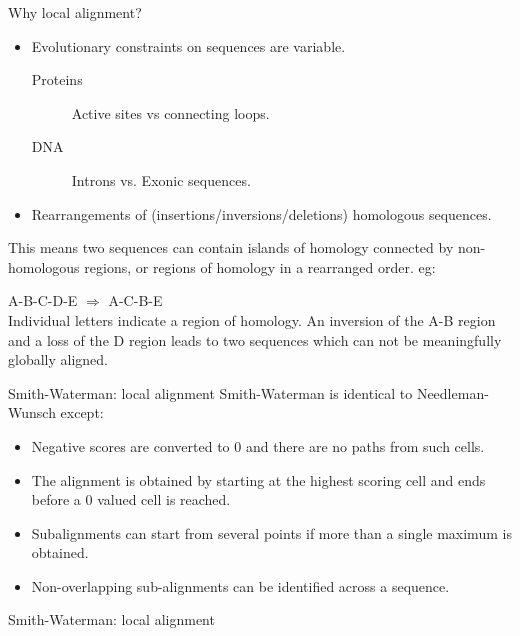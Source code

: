 \documentclass[pdf]{beamer}
\begin{document}
\begin{frame}[fragile]{Why local alignment?}
  \begin{itemize}
  \item Evolutionary constraints on sequences are variable.
    \begin{description}
    \item[Proteins] Active sites vs connecting loops.
    \item[DNA] Introns vs. Exonic sequences.
    \end{description}
  \item Rearrangements of (insertions/inversions/deletions) homologous
    sequences.
  \end{itemize}
  
  This means two sequences can contain islands of homology connected
  by non-homologous regions, or regions of homology in a rearranged order. eg:

  A-B-C-D-E $\Rightarrow$ A-C-B-E\\

  {\footnotesize Individual letters indicate a region of homology. An inversion of
    the A-B region and a loss of the D region leads to two sequences which can not
    be meaningfully globally aligned. }

\end{frame}

\begin{frame}{Smith-Waterman: local alignment}
  Smith-Waterman is identical to Needleman-Wunsch except:
  \begin{itemize}
  \item Negative scores are converted to 0 and there are no
    paths from such cells.
  \item The alignment is obtained by starting at the highest
    scoring cell and ends before a 0 valued cell is reached.
  \item Subalignments can start from several points if more than a single
    maximum is obtained.
  \item Non-overlapping sub-alignments can be identified across a sequence.
  \end{itemize}
\end{frame}

\begin{frame}{Smith-Waterman: local alignment}
  \begin{figure}[ht]
    \begin{tikzpicture}[scale=0.5]
      
    \end{tikzpicture}
  \end{figure}
\end{frame}
\end{document}
